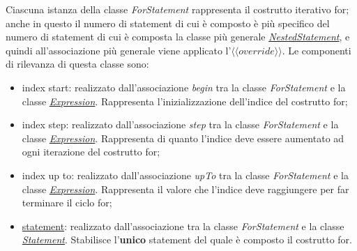 
Ciascuna istanza della classe \textit{ForStatement} rappresenta il costrutto iterativo for; anche in questo il numero di statement di cui è composto è più specifico del numero di statement di cui è composta la classe più generale \hyperref[sec:modelstranslator:analysis:statements_analysis:statement:nestedstatement]{\textit{NestedStatement}}, e quindi all'associazione più generale viene applicato l'$\langle\langle override \rangle\rangle$. Le componenti di rilevanza di questa classe sono:
\begin{itemize}
	\item index start: realizzato dall'associazione \textit{begin} tra la classe \textit{ForStatement} e la classe \hyperref[sec:modelstranslator:analysis:model_analysis:expression]{\textit{Expression}}. Rappresenta l'inizializzazione dell'indice del costrutto for;
	\item index step: realizzato dall'associazione \textit{step} tra la classe \textit{ForStatement} e la classe \hyperref[sec:modelstranslator:analysis:model_analysis:expression]{\textit{Expression}}. Rappresenta di quanto l'indice deve essere aumentato ad ogni iterazione del costrutto for;
	\item index up to: realizzato dall'associazione \textit{upTo} tra la classe \textit{ForStatement} e la classe \hyperref[sec:modelstranslator:analysis:model_analysis:expression]{\textit{Expression}}. Rappresenta il valore che l'indice deve raggiungere per far terminare il ciclo for;
	\item \hyperref[sec:modelstranslator:analysis:statements_analysis:statement]{statement}: realizzato dall'associazione tra la classe \textit{ForStatement} e la classe \hyperref[sec:modelstranslator:analysis:statements_analysis:statement]{\textit{Statement}}. Stabilisce l'\textbf{unico} statement del quale è composto il costrutto for.
\end{itemize}